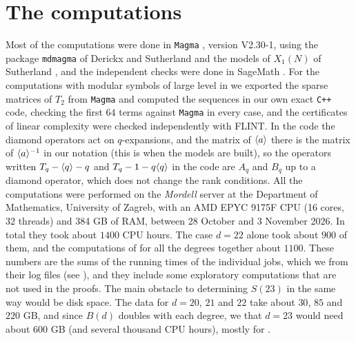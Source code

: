\section{The computations}\label{sec:computations}

Most of the computations were done in \texttt{Magma} \cite{magma}, version V2.30-1, using the package \texttt{mdmagma} of Derickx and Sutherland \cite{mdmagma} and the models of $X_1(N)$ of Sutherland \cite{sutherland,sutherlandX1}, and the independent checks were done in SageMath \cite{sagemath}. For the computations with modular symbols of large level in  we exported the sparse matrices of $T_2$ from \texttt{Magma} and computed the sequences in our own exact \texttt{C++} code, checking the first $64$ terms against \texttt{Magma} in every case, and the certificates of linear complexity were checked independently with FLINT. In the code the diamond operators act on $q$-expansions, and the matrix of $\langle a\rangle$ there is the matrix of $\langle a\rangle^{-1}$ in our notation (this is  when the models are built), so the operators written $T_q-\langle q\rangle-q$ and $T_q-1-q\langle q\rangle$ in the code are $A_q$ and $B_q$ up to a diamond operator, which does not change the rank conditions. All the computations were performed on the \textit{Mordell} server at the Department of Mathematics, University of Zagreb, with an AMD EPYC 9175F CPU (16 cores, 32 threads) and 384 GB of RAM, between 28 October and 3 November 2026. In total they took about $1400$ CPU hours. The case $d=22$ alone took about $900$ of them, and the computations of  for all the degrees together about $1100$. These numbers are the sums of the running times of the individual jobs, which we  from their log files (see ), and they include some exploratory computations that are not used in the proofs. The main obstacle to determining $S(23)$ in the same way would be disk space. The data for $d=20$, $21$ and $22$ take about $30$, $85$ and $220$ GB, and since $B(d)$ doubles with each degree, we  that $d=23$ would need about $600$ GB (and several thousand CPU hours), mostly for .

